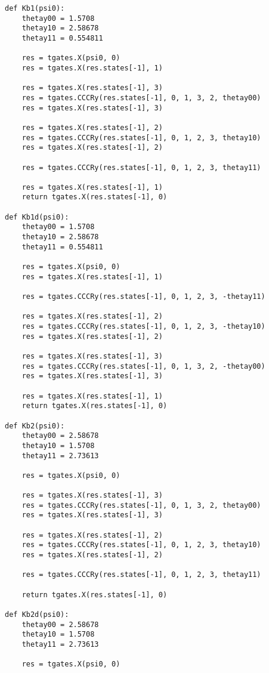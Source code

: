 \begin{verbatim}
def Kb1(psi0):
    thetay00 = 1.5708
    thetay10 = 2.58678
    thetay11 = 0.554811

    res = tgates.X(psi0, 0)
    res = tgates.X(res.states[-1], 1)

    res = tgates.X(res.states[-1], 3)
    res = tgates.CCCRy(res.states[-1], 0, 1, 3, 2, thetay00)
    res = tgates.X(res.states[-1], 3)

    res = tgates.X(res.states[-1], 2)
    res = tgates.CCCRy(res.states[-1], 0, 1, 2, 3, thetay10)
    res = tgates.X(res.states[-1], 2)

    res = tgates.CCCRy(res.states[-1], 0, 1, 2, 3, thetay11)

    res = tgates.X(res.states[-1], 1)
    return tgates.X(res.states[-1], 0)

def Kb1d(psi0):
    thetay00 = 1.5708
    thetay10 = 2.58678
    thetay11 = 0.554811

    res = tgates.X(psi0, 0)
    res = tgates.X(res.states[-1], 1)

    res = tgates.CCCRy(res.states[-1], 0, 1, 2, 3, -thetay11)

    res = tgates.X(res.states[-1], 2)
    res = tgates.CCCRy(res.states[-1], 0, 1, 2, 3, -thetay10)
    res = tgates.X(res.states[-1], 2)

    res = tgates.X(res.states[-1], 3)
    res = tgates.CCCRy(res.states[-1], 0, 1, 3, 2, -thetay00)
    res = tgates.X(res.states[-1], 3)

    res = tgates.X(res.states[-1], 1)
    return tgates.X(res.states[-1], 0)

def Kb2(psi0):
    thetay00 = 2.58678
    thetay10 = 1.5708
    thetay11 = 2.73613

    res = tgates.X(psi0, 0)

    res = tgates.X(res.states[-1], 3)
    res = tgates.CCCRy(res.states[-1], 0, 1, 3, 2, thetay00)
    res = tgates.X(res.states[-1], 3)

    res = tgates.X(res.states[-1], 2)
    res = tgates.CCCRy(res.states[-1], 0, 1, 2, 3, thetay10)
    res = tgates.X(res.states[-1], 2)

    res = tgates.CCCRy(res.states[-1], 0, 1, 2, 3, thetay11)

    return tgates.X(res.states[-1], 0)

def Kb2d(psi0):
    thetay00 = 2.58678
    thetay10 = 1.5708
    thetay11 = 2.73613

    res = tgates.X(psi0, 0)


\end{verbatim}
